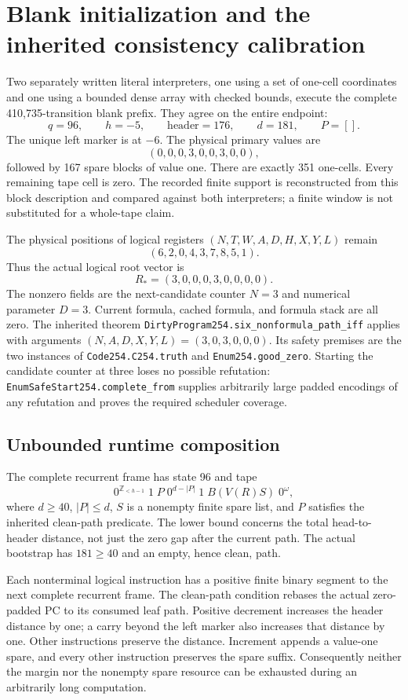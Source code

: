 \section{Blank initialization and the inherited consistency calibration}
\label{sec:calibration246}

Two separately written literal interpreters, one using a set of one-cell
coordinates and one using a bounded dense array with checked bounds,
execute the complete 410,735-transition blank prefix.  They agree on the
entire endpoint:
\[
 q=96,\qquad h=-5,\qquad \text{header}=176,\qquad d=181,\qquad P=[].
\]
The unique left marker is at $-6$.  The physical primary values are
\[
 (0,0,0,3,0,0,3,0,0),
\]
followed by 167 spare blocks of value one.  There are exactly 351 one-cells.
Every remaining tape cell is zero.  The recorded finite support is
reconstructed from this block description and compared against both
interpreters; a finite window is not substituted for a whole-tape claim.

The physical positions of logical registers $(N,T,W,A,D,H,X,Y,L)$ remain
\[
 (6,2,0,4,3,7,8,5,1).
\]
Thus the actual logical root vector is
\[
 R_*=(3,0,0,0,3,0,0,0,0).
\]
The nonzero fields are the next-candidate counter $N=3$ and numerical
parameter $D=3$.  Current formula, cached formula, and formula stack are
all zero.  The inherited theorem
\texttt{DirtyProgram254.six\_nonformula\_path\_iff}
applies with arguments $(N,A,D,X,Y,L)=(3,0,3,0,0,0)$.
Its safety premises are the two instances of
\texttt{Code254.C254.truth} and \texttt{Enum254.good\_zero}.
Starting the candidate counter at three loses no possible refutation:
\texttt{EnumSafeStart254.complete\_from} supplies arbitrarily large padded
encodings of any refutation and proves the required scheduler coverage.

\subsection{Unbounded runtime composition}

The complete recurrent frame has state 96 and tape
\[
 0^{\mathbb Z_{<h-1}}\;1\;P\;0^{d-|P|}\;1\;
 B(V(R)S)\;0^\omega,
\]
where $d\geq40$, $|P|\leq d$, $S$ is a nonempty finite spare list, and
$P$ satisfies the inherited clean-path predicate.  The lower bound concerns
the total head-to-header distance, not just the zero gap after the current
path.  The actual bootstrap has $181\geq40$ and an empty, hence clean,
path.

Each nonterminal logical instruction has a positive finite binary segment
to the next complete recurrent frame.  The clean-path condition rebases
the actual zero-padded PC to its consumed leaf path.  Positive decrement
increases the header distance by one; a carry beyond the left marker also
increases that distance by one.  Other instructions preserve the distance.
Increment appends a value-one spare, and every other instruction preserves
the spare suffix.  Consequently neither the margin nor the nonempty spare
resource can be exhausted during an arbitrarily long computation.

